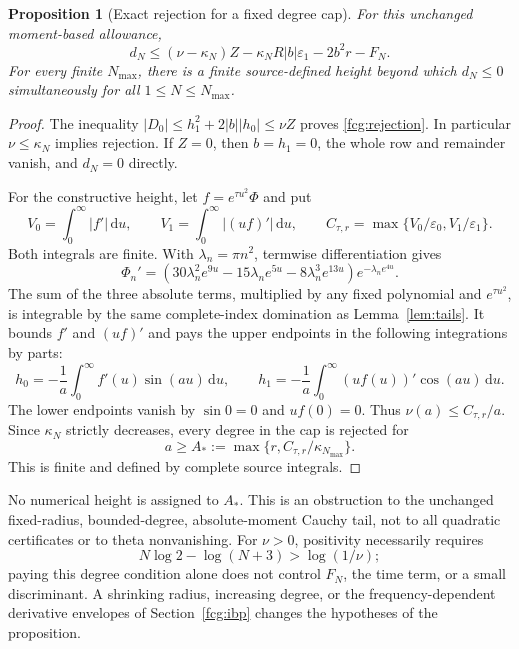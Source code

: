 \documentclass[11pt]{article}
\numberwithin{equation}{section}
\newtheorem{proposition}[theorem]{Proposition}
\newcommand{\dd}{\,\mathrm d}
\begin{document}
\begin{proposition}[Exact rejection for a fixed degree cap]
\label{fcg:fixedcap}
For this unchanged moment-based allowance,
\begin{equation}\label{fcg:rejection}
 d_N\le(\nu-\kappa_N)Z-\kappa_NR|b|\varepsilon_1-2b^2r-F_N.
\end{equation}
For every finite $N_{\max}$, there is a finite source-defined height
beyond which $d_N\le0$ simultaneously for all $1\le N\le N_{\max}$.
\end{proposition}
\begin{proof}
The inequality
$|D_0|\le h_1^2+2|b||h_0|\le\nu Z$ proves
\eqref{fcg:rejection}. In particular $\nu\le\kappa_N$ implies rejection.
If $Z=0$, then $b=h_1=0$, the whole row and remainder vanish, and
$d_N=0$ directly.

For the constructive height, let $f=e^{\tau u^2}\Phi$ and put
\[
 V_0=\int_0^\infty|f'|\dd u,\qquad
 V_1=\int_0^\infty|(uf)'|\dd u,\qquad
 C_{\tau,r}=\max\{V_0/\varepsilon_0,V_1/\varepsilon_1\}.
\]
Both integrals are finite. With $\lambda_n=\pi n^2$, termwise
differentiation gives
\begin{equation}\label{fcg:sourcederivative}
 \Phi_n'=
 (30\lambda_n^2e^{9u}-15\lambda_ne^{5u}
                     -8\lambda_n^3e^{13u})e^{-\lambda_ne^{4u}}.
\end{equation}
The sum of the three absolute terms, multiplied by any fixed
polynomial and $e^{\tau u^2}$, is integrable by the same complete-index
domination as Lemma~\ref{lem:tails}. It bounds $f'$ and $(uf)'$ and
pays the upper endpoints in the following integrations by parts:
\[
 h_0=-\frac1a\int_0^\infty f'(u)\sin(au)\dd u,\qquad
 h_1=-\frac1a\int_0^\infty(uf(u))'\cos(au)\dd u.
\]
The lower endpoints vanish by $\sin0=0$ and $uf(0)=0$.
Thus $\nu(a)\le C_{\tau,r}/a$. Since $\kappa_N$ strictly decreases,
every degree in the cap is rejected for
\[
 a\ge A_*:=\max\{r,C_{\tau,r}/\kappa_{N_{\max}}\}.
\]
This is finite and defined by complete source integrals.
\end{proof}

No numerical height is assigned to $A_*$. This is an obstruction to
the unchanged fixed-radius, bounded-degree, absolute-moment Cauchy
tail, not to all quadratic certificates or to theta nonvanishing.
For $\nu>0$, positivity necessarily requires
\[
 N\log2-\log(N+3)>\log(1/\nu);
\]
paying this degree condition alone does not control $F_N$, the time
term, or a small discriminant. A shrinking radius, increasing degree,
or the frequency-dependent derivative envelopes of
Section~\ref{fcg:ibp} changes the hypotheses of the proposition.
\end{document}

